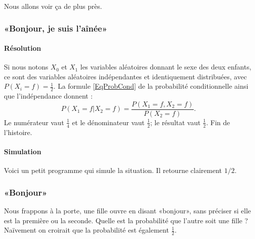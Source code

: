 Nous allons voir ça de plus près.

\subsubsection{«Bonjour, je suis l'aînée»}

\paragraph{Résolution}

Si nous notons \( X_0\) et \( X_1\) les variables aléatoires donnant le sexe des deux enfants, ce sont des variables aléatoires indépendantes et identiquement distribuées, avec \( P(X_i=f)=\frac{ 1 }{2}\). La formule \eqref{EqProbCond} de la probabilité conditionnelle ainsi que l'indépendance donnent :
\begin{equation}
    P(X_1=f|X_2=f)=\frac{ P(X_1=f,X_2=f) }{ P(X_2=f) }.
\end{equation}
Le numérateur vaut \( \frac{1}{ 4 }\) et le dénominateur vaut \( \frac{ 1 }{2}\); le résultat vaut \( \frac{ 1 }{2}\). Fin de l'histoire.

\paragraph{Simulation}

Voici un petit programme qui simule la situation. Il retourne clairement \( 1/2\).


\subsubsection{«Bonjour»}

Nous frappons à la porte, une fille ouvre en disant «bonjour», sans préciser si elle est la première ou la seconde. Quelle est la probabilité que l'autre soit une fille ? Naïvement on croirait que la probabilité est également \( \frac{ 1 }{2}\). 

